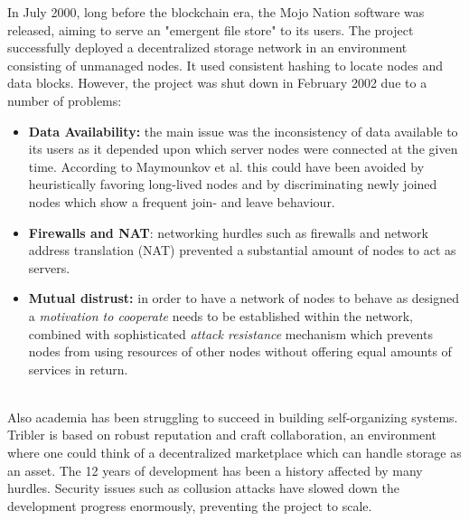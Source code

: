 \documentclass[conference]{IEEEtran}
\begin{document}
In July 2000, long before the blockchain era, the Mojo Nation software \cite{mojo-nation} was released, aiming to serve an "emergent file store" to its users.
The project successfully deployed a decentralized storage network in an environment consisting of unmanaged nodes.
It used consistent hashing \cite{consistent-hashing} to locate nodes and data blocks.
However, the project was shut down in February 2002 due to a number of problems:
\begin{itemize}
\item \textbf{Data Availability:} the main issue was the inconsistency of data available to its users as it depended upon which server nodes were connected at the given time.
According to Maymounkov et al.\cite{peer-to-peer-xor} this could have been avoided by heuristically favoring long-lived nodes and by discriminating newly joined nodes which show a frequent join- and leave behaviour.
\item \textbf{Firewalls and NAT}: networking hurdles such as firewalls and network address translation (NAT) prevented a substantial amount of nodes to act as servers.
\item \textbf{Mutual distrust:} in order to have a network of nodes to behave as designed a \textit{motivation to cooperate} needs to be established within the network, combined with sophisticated \textit{attack resistance} mechanism which prevents nodes from using resources of other nodes without offering equal amounts of services in return.
\end{itemize}
\hfill
\\
Also academia has been struggling to succeed in building self-organizing systems.
Tribler\cite{tribler} is based on robust reputation and craft collaboration, an environment where one could think of a decentralized marketplace which can handle storage as an asset.
The 12 years of development has been a history affected by many hurdles.
Security issues such as collusion attacks\cite{tribler-hurdles} have slowed down the development progress enormously, preventing the project to scale.
\end{document}
